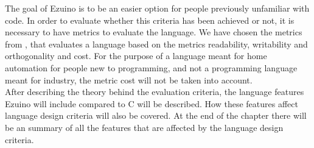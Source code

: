 The goal of Ezuino is to be an easier option for people previously unfamiliar with code. In order to evaluate whether this criteria has been achieved or not, it is necessary to have metrics to evaluate the language. We have chosen the metrics from \cite{conceptsOfProgrammingLanguages}, that evaluates a language based on the metrics readability, writability and orthogonality and cost. For the purpose of a language meant for home automation for people new to programming, and not a programming language meant for industry, the metric cost will not be taken into account. \\
After describing the theory behind the evaluation criteria, the language features Ezuino will include compared to C will be described. How these features affect language design criteria will also be covered. At the end of the chapter there will be an summary of all the features that are affected by the language design criteria. 